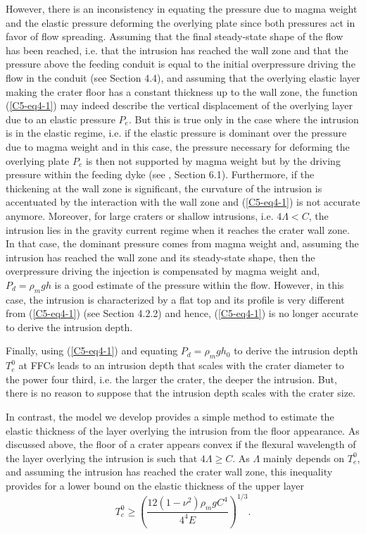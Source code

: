 However, there  is an  inconsistency in equating  the pressure  due to
magma weight  and the elastic  pressure deforming the  overlying plate
since both pressures act in favor of flow spreading. Assuming that the
final steady-state shape  of the flow has been reached,  i.e. that the
intrusion has  reached the wall zone  and that the pressure  above the
feeding conduit is equal to  the initial overpressure driving the flow
in  the conduit  (see Section  4.4), and  assuming that  the overlying
elastic layer making  the crater floor has a constant  thickness up to
the wall zone,  the function (\ref{C5-eq4-1}) may  indeed describe the
vertical  displacement  of  the  overlying layer  due  to  an  elastic
pressure  $P_{e}$.  But  this  is  true only  in  the  case where  the
intrusion is  in the elastic regime,  i.e. if the elastic  pressure is
dominant over the  pressure due to magma weight and  in this case, the
pressure necessary for  deforming the overlying plate  $P_{e}$ is then
not supported by  magma weight but by the driving  pressure within the
feeding dyke (see  \citep{Michaut:2011kg}, Section 6.1).  Furthermore,
if the  thickening at the wall  zone is significant, the  curvature of
the intrusion is accentuated by the interaction with the wall zone and
(\ref{C5-eq4-1}) is not accurate anymore.  Moreover, for large craters
or shallow intrusions, i.e.  $4\Lambda  <C$, the intrusion lies in the
gravity current regime  when it reaches the crater wall  zone. In that
case, the dominant pressure comes  from magma weight and, assuming the
intrusion has reached  the wall zone and its  steady-state shape, then
the overpressure driving the injection  is compensated by magma weight
and, $P_{d}=\rho_{m}gh$ is a good  estimate of the pressure within the
flow. However, in this case, the  intrusion is characterized by a flat
top  and its  profile  is very  different  from (\ref{C5-eq4-1})  (see
Section   4.2.2)   \citep{Bunger:2011cb,Michaut:2011kg}   and   hence,
(\ref{C5-eq4-1}) is no longer accurate to derive the intrusion depth.
		
Finally,  using (\ref{C5-eq4-1})  and equating  $P_d=\rho_m g  h_0$ to
derive the intrusion depth $T_e^0$ at FFCs leads to an intrusion depth
that scales with the crater diameter to the power four third, i.e. the
larger the crater, the deeper the  intrusion.  But, there is no reason
to suppose that the intrusion depth scales with the crater size.
		
In contrast, the model we develop provides a simple method to estimate
the elastic  thickness of the  layer overlying the intrusion  from the
floor appearance.  As  discussed above, the floor of  a crater appears
convex if the flexural wavelength of the layer overlying the intrusion
is  such that  $4  \Lambda \ge  C$.  As  $\Lambda$  mainly depends  on
$T_{e}^0$,  and assuming  the intrusion  has reached  the crater  wall
zone,  this inequality  provides  for  a lower  bound  on the  elastic
thickness of the upper layer
\begin{equation}
  T_{e}^0 \ge \left(\frac{12(1-\nu^{2})\rho_{m}gC^{4}}{4^4 E}\right)^{1/3}.
  \label{C5-eq5-2}
\end{equation}

